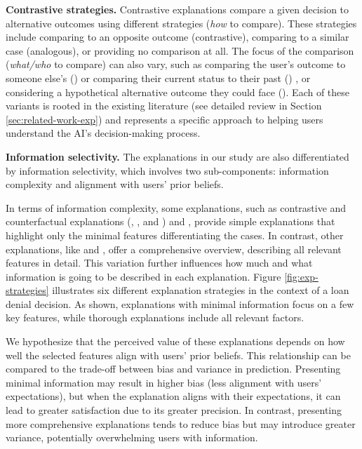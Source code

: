 {\bf Contrastive strategies.} Contrastive explanations compare a given decision to alternative outcomes using different strategies ({\it how} to compare). These strategies include comparing to an opposite outcome (contrastive), comparing to a similar case (analogous), or providing no comparison at all. The focus of the comparison ({\it what/who} to compare) can also vary, such as comparing the user's outcome to someone else's (\cto) or comparing their current status to their past (\ctt) \cite{miller2019explanation, RemoteCausesBadExplanations}, or considering a hypothetical alternative outcome they could face (\cf). Each of these variants is rooted in the existing literature (see detailed review in Section \ref{sec:related-work-exp}) and represents a specific approach to helping users understand the AI's decision-making process.

{\bf Information selectivity.} The explanations in our study are also differentiated by information selectivity, which involves two sub-components: information complexity and alignment with users' prior beliefs. 

In terms of information complexity, some explanations, such as contrastive and counterfactual explanations (\cto, \ctt, and \cf) and \cbhe \cite{ EvaluationUsefulnessCaseBasedExplanationa, stolpmann1999optimierung}, provide simple explanations that highlight only the minimal features differentiating the cases. In contrast, other explanations, like \comp and \cbho \cite{el2015case, ExplanationsCaseBasedReasoningFoundational}, offer a comprehensive overview, describing all relevant features in detail. This variation further influences how much and what information is going to be described in each explanation. Figure \ref{fig:exp-strategies} illustrates six different explanation strategies in the context of a loan denial decision. As shown, explanations with minimal information focus on a few key features, while thorough explanations include all relevant factors.

We hypothesize that the perceived value of these explanations depends on how well the selected features align with users' prior beliefs. This relationship can be compared to the trade-off between bias and variance in prediction. Presenting minimal information may result in higher bias (less alignment with users' expectations), but when the explanation aligns with their expectations, it can lead to greater satisfaction due to its greater precision. In contrast, presenting more comprehensive explanations tends to reduce bias but may introduce greater variance, potentially overwhelming users with information.


